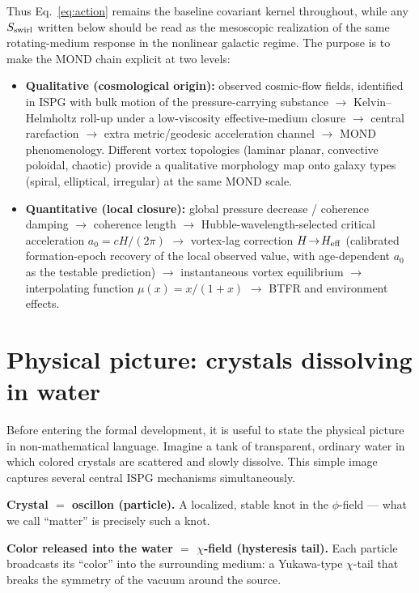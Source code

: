\documentclass[11pt]{article}
\begin{document}
Thus Eq.~\eqref{eq:action} remains the baseline covariant kernel throughout, while any $S_{\rm swirl}$ written below should be read as the mesoscopic realization of the same rotating-medium response in the nonlinear galactic regime.
The purpose is to make the MOND chain explicit at two levels:
\begin{itemize}
\item \textbf{Qualitative (cosmological origin):} observed cosmic-flow fields, identified in ISPG with bulk motion of the pressure-carrying substance $\rightarrow$ Kelvin--Helmholtz roll-up under a low-viscosity effective-medium closure $\rightarrow$ central rarefaction $\rightarrow$ extra metric/geodesic acceleration channel $\rightarrow$ MOND phenomenology.  Different vortex topologies (laminar planar, convective poloidal, chaotic) provide a qualitative morphology map onto galaxy types (spiral, elliptical, irregular) at the same MOND scale.
\item \textbf{Quantitative (local closure):} global pressure decrease / coherence damping $\rightarrow$ coherence length $\rightarrow$ Hubble-wavelength-selected critical acceleration $a_0=cH/(2\pi)$ $\rightarrow$ vortex-lag correction $H\!\to\!H_{\rm eff}$ (calibrated formation-epoch recovery of the local observed value, with age-dependent $a_0$ as the testable prediction) $\rightarrow$ instantaneous vortex equilibrium $\rightarrow$ interpolating function $\mu(x)=x/(1+x)$ $\rightarrow$ BTFR and environment effects.
\end{itemize}

{}
\section*{Physical picture: crystals dissolving in water}\label{sec:physical_picture}
Before entering the formal development, it is useful to state the physical picture in non-mathematical language. Imagine a tank of transparent, ordinary water in which colored crystals are scattered and slowly dissolve. This simple image captures several central ISPG mechanisms simultaneously.

\textbf{Crystal $=$ oscillon (particle).} A localized, stable knot in the $\phi$-field --- what we call ``matter'' is precisely such a knot.

\textbf{Color released into the water $=$ $\chi$-field (hysteresis tail).} Each particle broadcasts its ``color'' into the surrounding medium: a Yukawa-type $\chi$-tail that breaks the symmetry of the vacuum around the source.
\end{document}
